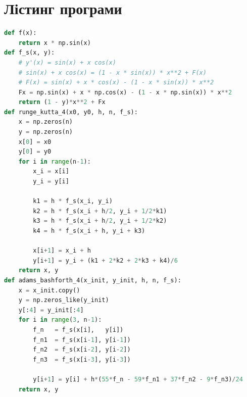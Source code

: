 \documentclass{article}
\begin{document}
    \section{Лістинг програми}
    \begin{lstlisting}[language=Python, caption=Code]
def f(x):
    return x * np.sin(x)
def f_s(x, y):
    # y'(x) = sin(x) + x cos(x)
    # sin(x) + x cos(x) = (1 - x * sin(x)) * x**2 + F(x)
    # F(x) = sin(x) + x * cos(x) - (1 - x * sin(x)) * x**2
    Fx = np.sin(x) + x * np.cos(x) - (1 - x * np.sin(x)) * x**2
    return (1 - y)*x**2 + Fx
def runge_kutta_4(x0, y0, h, n, f_s):
    x = np.zeros(n)
    y = np.zeros(n)
    x[0] = x0
    y[0] = y0
    for i in range(n-1):
        x_i = x[i]
        y_i = y[i]

        k1 = h * f_s(x_i, y_i)
        k2 = h * f_s(x_i + h/2, y_i + 1/2*k1)
        k3 = h * f_s(x_i + h/2, y_i + 1/2*k2)
        k4 = h * f_s(x_i + h, y_i + k3)

        x[i+1] = x_i + h
        y[i+1] = y_i + (k1 + 2*k2 + 2*k3 + k4)/6
    return x, y
def adams_bashforth_4(x_init, y_init, h, n, f_s):
    x = x_init.copy()
    y = np.zeros_like(y_init)
    y[:4] = y_init[:4]
    for i in range(3, n-1):
        f_n   = f_s(x[i],   y[i])
        f_n1  = f_s(x[i-1], y[i-1])
        f_n2  = f_s(x[i-2], y[i-2])
        f_n3  = f_s(x[i-3], y[i-3])

        y[i+1] = y[i] + h*(55*f_n - 59*f_n1 + 37*f_n2 - 9*f_n3)/24
    return x, y
    \end{lstlisting}
\end{document}

